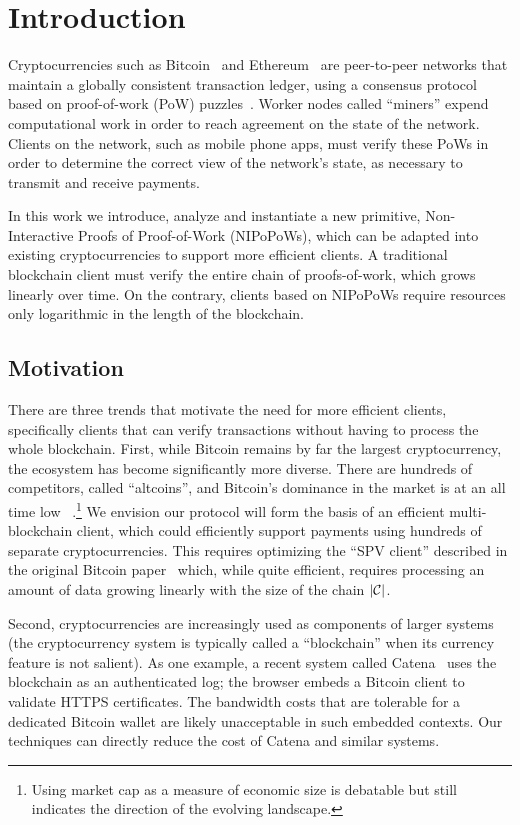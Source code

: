 \section{Introduction}

Cryptocurrencies such as Bitcoin~\cite{bitcoin}\cite{bitcoinsoftware} and
Ethereum~\cite{ethereum} are peer-to-peer networks that maintain a globally
consistent transaction ledger, using a consensus protocol based on proof-of-work
(PoW) puzzles~\cite{pow,hashcash}. Worker nodes called ``miners'' expend
computational work in order to reach agreement on the state of the network.
Clients on the network, such as mobile phone apps, must verify these
PoWs in order to determine the correct view of the network's state, as necessary
to transmit and receive payments.

In this work we introduce, analyze and instantiate a new primitive,
Non-Interactive Proofs of Proof-of-Work (NIPoPoWs), which can be adapted into
existing cryptocurrencies to support more efficient clients. A traditional
blockchain client must verify the entire chain of proofs-of-work, which grows
linearly over time. On the contrary, clients based on NIPoPoWs require resources
only logarithmic in the length of the blockchain.

\subsection{Motivation}
There are three trends that motivate the need for more efficient clients,
specifically clients that can verify transactions without having to process the
whole blockchain. First, while Bitcoin remains by far the largest
cryptocurrency, the ecosystem has become significantly more diverse. There are
hundreds of competitors, called ``altcoins'', and Bitcoin's dominance in the
market is at an all time low ~\cite{marketcap}.\footnote{Using market cap as a
measure of economic size is debatable but still indicates the direction of the
evolving landscape.} We envision our protocol will form the basis of an
efficient multi-blockchain client, which could efficiently support payments
using hundreds of separate cryptocurrencies. This requires optimizing the ``SPV
client'' described in the original Bitcoin paper~\cite{bitcoin} which, while
quite efficient, requires processing an amount of data growing linearly with the
size of the chain $|\mathcal{C}|$.

Second, cryptocurrencies are increasingly used as components of larger systems
(the cryptocurrency system is typically called a ``blockchain'' when its
currency feature is not salient). As one example, a recent system called
Catena~\cite{catena} uses the blockchain as an authenticated log; the browser
embeds a Bitcoin client to validate HTTPS certificates. The bandwidth costs that
are tolerable for a dedicated Bitcoin wallet are likely unacceptable in such
embedded contexts. Our techniques can directly reduce the cost of Catena and
similar systems.


